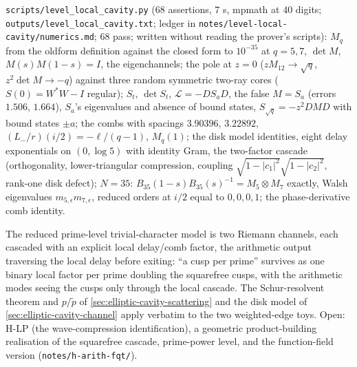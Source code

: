 \begin{numerical}
\label{num:level-local-cavity}
\texttt{scripts/level\_local\_cavity.py} ($68$ assertions, $7$ s, mpmath at $40$ digits; \texttt{outputs/level\_local\_cavity.txt}; ledger in
\texttt{notes/level-local-cavity/numerics.md}; $68$ pass; written without reading the prover's scripts): $M_q$ from the oldform
definition against the closed form to $10^{-35}$ at $q = 5,7$, $\det M$, $M(s)M(1-s) = I$, the eigenchannels; the pole at $z = 0$
($zM_{12}\to\sqrt q$, $z^2\det M\to-q$) against three random symmetric two-ray cores ($S(0) = W^{*}W-I$ regular); $S_t$, $\det S_t$,
$\mathcal L = -DS_aD$, the false $M = S_a$ (errors $1.506$, $1.664$), $S_a$'s eigenvalues and absence of bound states, $S_{\sqrt q} = -z^2DMD$
with bound states $\pm a$; the combs with spacings $3.90396$, $3.22892$, $(L_-/r)(i/2) = -\ell/(q-1)$, $M_q(1)$; the disk model
identities, eight delay exponentials on $(0,\log5)$ with identity Gram, the two-factor cascade (orthogonality, lower-triangular
compression, coupling $\sqrt{1-|c_1|^2}\sqrt{1-|c_2|^2}$, rank-one disk defect); $N = 35$: $B_{35}(1-s)B_{35}(s)^{-1} = M_5\otimes M_7$
exactly, Walsh eigenvalues $m_{5,\epsilon}m_{7,\epsilon}$, reduced orders at $i/2$ equal to $0,0,0,1$; the phase-derivative comb identity.
\end{numerical}

\begin{observation}
\label{obs:level-local-next}
The reduced prime-level trivial-character model is two Riemann channels, each cascaded with an explicit local delay/comb
factor, the arithmetic output traversing the local delay before exiting: ``a cusp per prime'' survives as one binary local
factor per prime doubling the squarefree cusps, with the arithmetic modes seeing the cusps only through the local cascade.
The Schur-resolvent theorem and $p/\tilde p$ of \cref{sec:elliptic-cavity-scattering} and the disk model of
\cref{sec:elliptic-cavity-channel} apply verbatim to the two weighted-edge toys. Open: H-LP (the wave-compression
identification), a geometric product-building realisation of the squarefree cascade, prime-power level, and the function-field
version (\texttt{notes/h-arith-fqt/}).
\end{observation}
